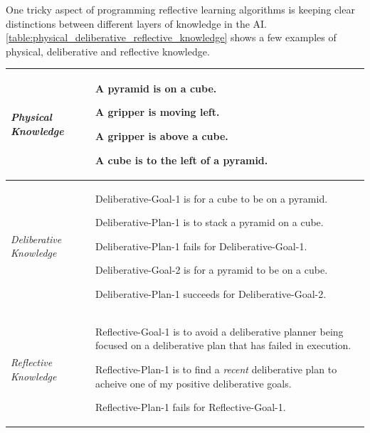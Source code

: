 One tricky aspect of programming reflective learning algorithms is
keeping clear distinctions between different layers of knowledge in
the AI.  {\autoref{table:physical_deliberative_reflective_knowledge}}
shows a few examples of physical, deliberative and reflective
knowledge.
\begin{table}
\centering
\begin{tabular}{|p{2cm}|p{10cm}|}
\hline \emph{Physical Knowledge} & \begin{packed_itemize}
\item{A pyramid is on a cube.}
\item{A gripper is moving left.}
\item{A gripper is above a cube.}
\item{A cube is to the left of a pyramid.}
\end{packed_itemize} \\
\hline \emph{Deliberative Knowledge} & \begin{packed_itemize}
\item{Deliberative-Goal-1 is for a cube to be on a pyramid.}
\item{Deliberative-Plan-1 is to stack a pyramid on a cube.}
\item{Deliberative-Plan-1 fails for Deliberative-Goal-1.}
\item{Deliberative-Goal-2 is for a pyramid to be on a cube.}
\item{Deliberative-Plan-1 succeeds for Deliberative-Goal-2.}
\end{packed_itemize} \\
\hline \emph{Reflective Knowledge}   & \begin{packed_itemize}
\item{Reflective-Goal-1 is to avoid a deliberative planner being
  focused on a deliberative plan that has failed in execution.}
\item{Reflective-Plan-1 is to find a {\emph{recent}} deliberative plan
  to acheive one of my positive deliberative goals.}
\item{Reflective-Plan-1 fails for Reflective-Goal-1.}

\end{packed_itemize}
\end{tabular}
\end{table}
